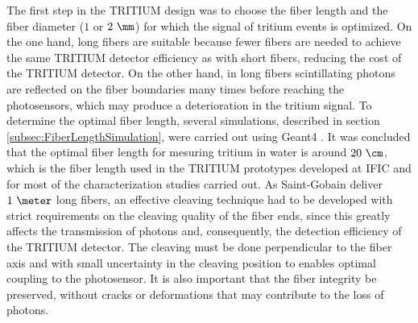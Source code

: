 The first step in the TRITIUM design was to choose the fiber length and the fiber diameter ($1$ or $2~\mm$) for which the signal of tritium events is optimized. On the one hand, long fibers are suitable because fewer fibers are needed to achieve the same TRITIUM detector efficiency as with short fibers, reducing the cost of the TRITIUM detector. On the other hand, in long fibers scintillating photons are reflected on the fiber boundaries many times before reaching the photosensors, which may produce a deterioration in the tritium signal. To determine the optimal fiber length, several simulations, described in section \ref{subsec:FiberLengthSimulation}, were carried out using Geant4 \cite{Geant4WebPage}. It was concluded that the optimal fiber length for mesuring tritium in water is around $20~\cm$, which is the fiber length used in the TRITIUM prototypes developed at IFIC and for most of the characterization studies carried out. As Saint-Gobain deliver $1~\meter$ long fibers, an effective cleaving technique had to be developed with strict requirements on the cleaving quality of the fiber ends, since this greatly affects the transmission of photons and, consequently, the detection efficiency of the TRITIUM detector. The cleaving must be done perpendicular to the fiber axis and with small uncertainty in the cleaving position to enables optimal coupling to the photosensor. It is also important that the fiber integrity be preserved, without cracks or deformations that may contribute to the loss of photons. 

